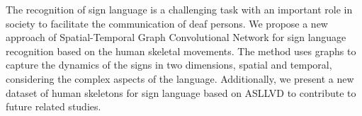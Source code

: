 The recognition of sign language is a challenging task with an important role in society to facilitate the communication of deaf persons. We propose a new approach of Spatial-Temporal Graph Convolutional Network for sign language recognition based on the human skeletal movements. The method uses graphs to capture the dynamics of the signs in two dimensions, spatial and temporal, considering the complex aspects of the language. Additionally, we present a new dataset of human skeletons for sign language based on ASLLVD to contribute to future related studies. 
